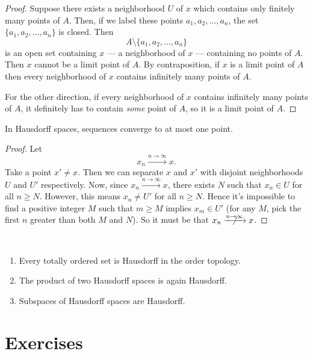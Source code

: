 \documentclass{article}
\begin{document}
\begin{proof}
    Suppose there exists a neighborhood $U$ of $x$ which contains only finitely many points of $A$.
    Then, if we label these points $a_1, a_2, \ldots, a_n$, the set $\{a_1, a_2, \ldots, a_n\}$ is closed. Then
    \[
        A \setminus \{a_1, a_2, \ldots, a_n\}
    \]
    is an open set containing $x$ --- a neighborhood of $x$ --- containing no points of $A$.
    Then $x$ cannot be a limit point of $A$.
    By contraposition, if $x$ is a limit point of $A$ then every neighborhood of $x$ contains infinitely many points of $A$.

    For the other direction, if every neighborhood of $x$ contains infinitely many points of $A$, it definitely has to contain \textit{some} point of $A$, so it is a limit point of $A$.
\end{proof}

\begin{theorem}
    In Hausdorff spaces, sequences converge to at most one point.
\end{theorem}

\begin{proof}
    Let
    \[
        x_n \xrightarrow{n\to\infty} x.
    \]
    Take a point $x' \neq x$.
    Then we can separate $x$ and $x'$ with disjoint neighborhoods $U$ and $U'$ respectively.
    Now, since $x_n \xrightarrow{n\to\infty} x$, there exists $N$ such that $x_n \in U$ for all $n \geq N$.
    However, this means $x_n \neq U'$ for all $n \geq N$.
    Hence it's impossible to find a positive integer $M$ such that $m \geq M$ implies $x_m \in U'$ (for any $M$, pick the first $n$ greater than both $M$ and $N$).
    So it must be that $x_n \centernot{\xrightarrow{n\to\infty}}x$.
\end{proof}

\begin{theorem}\
    \begin{enumerate}[label=(\alph*)]
        \item Every totally ordered set is Hausdorff in the order topology.
        \item The product of two Hausdorff spaces is again Hausdorff.
        \item Subspaces of Hausdorff spaces are Hausdorff.
    \end{enumerate}
\end{theorem}

\section*{Exercises}
\end{document}
